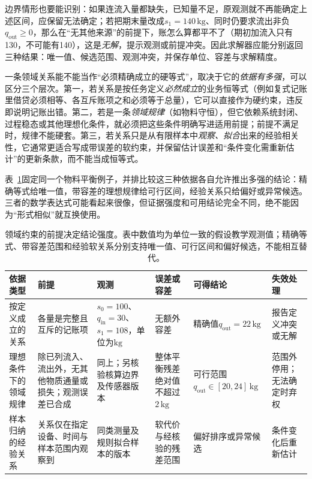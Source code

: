 边界情形也要能识别：如果连流入量都缺失，已知量不足，原观测就不再能确定上述区间，应保留无法确定；若把期末量改成$s_1=140\,\mathrm{kg}$、同时仍要求流出非负$q_{\mathrm{out}}\geq0$，那么在“无其他来源”的前提下，账怎么算都平不了（期初加流入只有130，不可能有140），这是\emph{无解}，提示观测或前提冲突。因此求解器应能分别返回三种结果：唯一值、候选范围、观测冲突，并保存单位、容差与求解精度。

一条领域关系能不能当作“必须精确成立的硬等式”，取决于它的\emph{依据有多强}，可以区分三个层次。第一，若关系是按任务定义\emph{必然成立}的业务恒等式（例如复式记账里借贷必须相等、各互斥账项之和必须等于总量），它可以直接作为硬约束，违反即说明记账出错。第二，若是一条\emph{领域规律}（如物料守恒），但它依赖系统封闭、过程稳态或其他理想化条件，就必须把这些条件明确写进适用前提；前提不满足时，规律不能硬套。第三，若关系只是从有限样本中\emph{观察、拟合}出来的经验相关性，它通常更适合写成带误差的软约束，并保留估计误差和“条件变化需重新估计”的更新条款，而不能当成恒等式。

表~\ref{tab:rule-based-knowledge-acquisition-domain-constraint}固定同一个物料平衡例子，并排比较这三种依据各自允许推出多强的结论：精确等式给唯一值，带容差的理想规律给可行区间，经验关系只给偏好或异常候选。三者的数学表达式可能看起来很像，但证据强度和可用结论完全不同，绝不能因为“形式相似”就互换使用。

\begin{table}[htbp]
  \centering
  \begingroup
  \setlength{\tabcolsep}{2.5pt}
  \setlength{\parindent}{0pt}
  \setlength{\RaggedRightParindent}{0pt}
  \renewcommand{\arraystretch}{1.12}
  \begin{tabularx}{\linewidth}{>{\raggedright\arraybackslash}p{23mm}>{\raggedright\arraybackslash}p{32mm}>{\raggedright\arraybackslash}p{25mm}>{\raggedright\arraybackslash}p{26mm}>{\raggedright\arraybackslash}p{32mm}>{\raggedright\arraybackslash}X}
    \toprule
    依据类型 & 前提 & 观测 & 误差或容差 & 可得结论 & 失效处理 \\
    \midrule
    按定义成立的关系 & 各量是完整且互斥的记账项 & $s_0=100$、$q_{\mathrm{in}}=30$、$s_1=108$，单位为$\mathrm{kg}$ & 无额外容差 & 精确值$q_{\mathrm{out}}=22\,\mathrm{kg}$ & 报告定义冲突或无解 \\
    理想条件下的领域规律 & 除已列流入、流出外，无其他物质通量或损失；观测误差已合成 & 同上；另核验核算边界及传感器版本 & 整体平衡残差绝对值不超过$2\,\mathrm{kg}$ & 可行范围$q_{\mathrm{out}}\in[20,24]\,\mathrm{kg}$ & 范围外停用；无法确定时弃权 \\
    样本归纳的经验关系 & 关系仅在指定设备、时间与样本范围内观察到 & 同类测量及规则拟合样本的版本 & 软代价与经核验的残差范围 & 偏好排序或异常候选 & 条件变化后重新估计 \\
    \bottomrule
  \end{tabularx}
  \endgroup
  \caption{领域约束的前提决定结论强度。表中数值均为单位一致的假设教学观测值；精确等式、带容差范围和经验软关系分别支持唯一值、可行区间和偏好候选，不能相互替代。}
  \label{tab:rule-based-knowledge-acquisition-domain-constraint}
\end{table}

